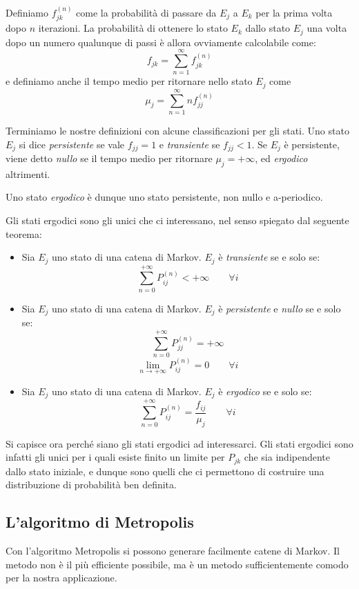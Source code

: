 \documentclass[a4paper,10pt]{article}
\begin{document}
Definiamo $f_{jk}^{(n)}$ come la probabilità di passare da $E_j$ a $E_k$ per la prima volta dopo $n$ iterazioni.
La probabilità di ottenere lo stato $E_k$ dallo stato $E_j$ una volta dopo un numero qualunque di passi è allora ovviamente calcolabile come:
$$f_{jk} = \sum_{n=1}^\infty f_{jk}^{(n)} $$
e definiamo anche il tempo medio per ritornare nello stato $E_j$ come
$$\mu_j = \sum_{n=1}^\infty n f_{jj}^{(n)}$$

Terminiamo le nostre definizioni con alcune classificazioni per gli stati. Uno stato $E_j$ si dice \emph{persistente} se vale $f_{jj}=1$ e \emph{transiente} se $f_{jj}<1$. Se $E_j$ è persistente, viene detto \emph{nullo} se il tempo medio per ritornare $\mu_j = +\infty$, ed \emph{ergodico} altrimenti.

Uno stato \emph{ergodico} è dunque uno stato persistente, non nullo e a-periodico.

Gli stati ergodici sono gli unici che ci interessano, nel senso spiegato dal seguente teorema:
\begin{itemize}
 \item Sia $E_j$ uno stato di una catena di Markov. $E_j$ è \emph{transiente} se e solo se:
 $$\sum_{n=0}^{+\infty} P^{(n)}_{ij} < +\infty\qquad \forall i$$
 
 \item Sia $E_j$ uno stato di una catena di Markov. $E_j$ è \emph{persistente} e \emph{nullo} se e solo se:
 $$\sum_{n=0}^{+\infty} P^{(n)}_{jj} = +\infty $$
 $$\lim_{n\to+\infty} P^{(n)}_{ij} = 0 \qquad \forall i$$
 
 \item Sia $E_j$ uno stato di una catena di Markov. $E_j$ è \emph{ergodico} se e solo se:
 $$\sum_{n=0}^{+\infty} P^{(n)}_{ij} = \frac{f_{ij}}{\mu_j} \qquad \forall i$$
 
\end{itemize}

Si capisce ora perché siano gli stati ergodici ad interessarci. Gli stati ergodici sono infatti gli unici per i quali esiste finito un limite per $P_{jk}$ che sia indipendente dallo stato iniziale, e dunque sono quelli che ci permettono di costruire una distribuzione di probabilità ben definita.

\subsection{L'algoritmo di Metropolis}
Con l'algoritmo Metropolis si possono generare facilmente catene di Markov. Il metodo non è il più efficiente possibile, ma è un metodo sufficientemente comodo per la nostra applicazione.
\end{document}
